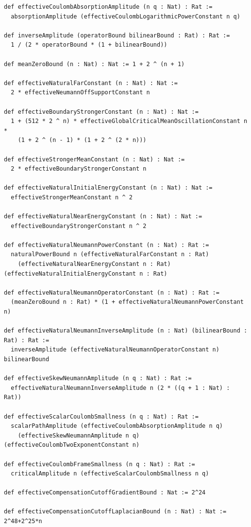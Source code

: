 \documentclass[reqno,11pt]{amsart}
\numberwithin{equation}{section}
\theoremstyle{definition}
\theoremstyle{remark}
\begin{document}
\begin{lstlisting}
def effectiveCoulombAbsorptionAmplitude (n q : Nat) : Rat :=
  absorptionAmplitude (effectiveCoulombLogarithmicPowerConstant n q)

def inverseAmplitude (operatorBound bilinearBound : Rat) : Rat :=
  1 / (2 * operatorBound * (1 + bilinearBound))

def meanZeroBound (n : Nat) : Nat := 1 + 2 ^ (n + 1)

def effectiveNaturalFarConstant (n : Nat) : Nat :=
  2 * effectiveNeumannOffSupportConstant n

def effectiveBoundaryStrongerConstant (n : Nat) : Nat :=
  1 + (512 * 2 ^ n) * effectiveGlobalCriticalMeanOscillationConstant n *
    (1 + 2 ^ (n - 1) * (1 + 2 ^ (2 * n)))

def effectiveStrongerMeanConstant (n : Nat) : Nat :=
  2 * effectiveBoundaryStrongerConstant n

def effectiveNaturalInitialEnergyConstant (n : Nat) : Nat :=
  effectiveStrongerMeanConstant n ^ 2

def effectiveNaturalNearEnergyConstant (n : Nat) : Nat :=
  effectiveBoundaryStrongerConstant n ^ 2

def effectiveNaturalNeumannPowerConstant (n : Nat) : Rat :=
  naturalPowerBound n (effectiveNaturalFarConstant n : Rat)
    (effectiveNaturalNearEnergyConstant n : Rat) (effectiveNaturalInitialEnergyConstant n : Rat)

def effectiveNaturalNeumannOperatorConstant (n : Nat) : Rat :=
  (meanZeroBound n : Rat) * (1 + effectiveNaturalNeumannPowerConstant n)

def effectiveNaturalNeumannInverseAmplitude (n : Nat) (bilinearBound : Rat) : Rat :=
  inverseAmplitude (effectiveNaturalNeumannOperatorConstant n) bilinearBound

def effectiveSkewNeumannAmplitude (n q : Nat) : Rat :=
  effectiveNaturalNeumannInverseAmplitude n (2 * ((q + 1 : Nat) : Rat))

def effectiveScalarCoulombSmallness (n q : Nat) : Rat :=
  scalarPathAmplitude (effectiveCoulombAbsorptionAmplitude n q)
    (effectiveSkewNeumannAmplitude n q) (effectiveCoulombTwoExponentConstant n)

def effectiveCoulombFrameSmallness (n q : Nat) : Rat :=
  criticalAmplitude n (effectiveScalarCoulombSmallness n q)

def effectiveCompensationCutoffGradientBound : Nat := 2^24

def effectiveCompensationCutoffLaplacianBound (n : Nat) : Nat := 2^48+2^25*n


\end{lstlisting}
\end{document}
